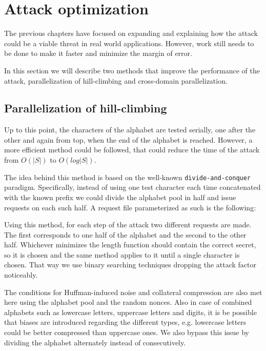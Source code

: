 \section{Attack optimization}\label{sec:optimization}

The previous chapters have focused on expanding and explaining how the attack
could be a viable threat in real world applications. However, work still needs
to be done to make it faster and minimize the margin of error.

In this section we will describe two methods that improve the performance of the
attack, parallelization of hill-climbing and cross-domain parallelization.

\subsection{Parallelization of hill-climbing}

Up to this point, the characters of the alphabet are tested serially, one after
the other and again from top, when the end of the alphabet is reached. However,
a more efficient method could be followed, that could reduce the time of the
attack from \begin{math}O(|S|)\end{math} to \begin{math}O(log|S|)\end{math}.

The idea behind this method is based on the well-known
\texttt{divide-and-conquer} paradigm. Specifically, instead of using one test
character each time concatenated with the known prefix we could divide the
alphabet pool in half and issue requests on each such half. A request file
parameterized as such is the following:


Using this method, for each step of the attack two different requests are made.
The first corresponds to one half of the alphabet and the second to the other
half. Whichever minimizes the length function should contain
the correct secret, so it is chosen and the same method applies to it until a
single character is chosen. That way we use binary searching techniques
dropping the attack factor noticeably.

The conditions for Huffman-induced noise and collateral compression are also met
here using the alphabet pool and the random nonces. Also in case of combined
alphabets such as lowercase letters, uppercase letters and digits, it is be
possible that biases are introduced regarding the different types, e.g.
lowercase letters could be better compressed than uppercase ones. We also bypass
this issue by dividing the alphabet alternately instead of consecutively.

